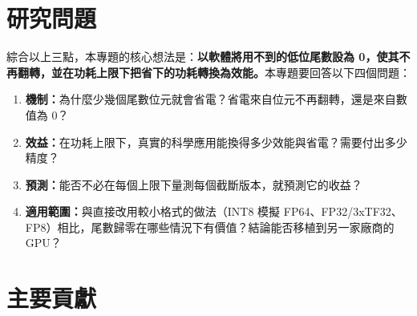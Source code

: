 \section{研究問題}\label{sec:questions}

綜合以上三點，本專題的核心想法是：\textbf{以軟體將用不到的低位尾數設為 0，使其不再翻轉，並在功耗上限下把省下的功耗轉換為效能。}本專題要回答以下四個問題：

\begin{enumerate}
  \item \textbf{機制：}為什麼少幾個尾數位元就會省電？省電來自位元不再翻轉，還是來自數值為 0？
  \item \textbf{效益：}在功耗上限下，真實的科學應用能換得多少效能與省電？需要付出多少精度？
  \item \textbf{預測：}能否不必在每個上限下量測每個截斷版本，就預測它的收益？
  \item \textbf{適用範圍：}與直接改用較小格式的做法（INT8 模擬 FP64、FP32/3xTF32、FP8）相比，尾數歸零在哪些情況下有價值？結論能否移植到另一家廠商的 GPU？
\end{enumerate}

\section{主要貢獻}\label{sec:contrib}

